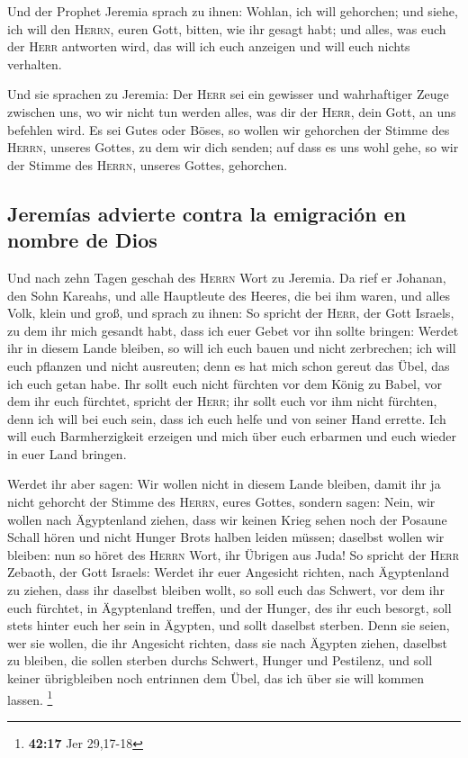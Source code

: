  Und der Prophet Jeremia sprach zu ihnen: Wohlan, ich will
gehorchen; und siehe, ich will den \textsc{Herrn}, euren Gott, bitten,
wie ihr gesagt habt; und alles, was euch der \textsc{Herr} antworten
wird, das will ich euch anzeigen und will euch nichts verhalten.

 Und sie sprachen zu Jeremia: Der \textsc{Herr} sei ein
gewisser und wahrhaftiger Zeuge zwischen uns, wo wir nicht tun werden
alles, was dir der \textsc{Herr}, dein Gott, an uns befehlen wird.
 Es sei Gutes oder Böses, so wollen wir gehorchen der
Stimme des \textsc{Herrn}, unseres Gottes, zu dem wir dich senden; auf
dass es uns wohl gehe, so wir der Stimme des \textsc{Herrn}, unseres
Gottes, gehorchen.

\hypertarget{jeremuxedas-advierte-contra-la-emigraciuxf3n-en-nombre-de-dios}{%
\subsection{Jeremías advierte contra la emigración en nombre de
Dios}\label{jeremuxedas-advierte-contra-la-emigraciuxf3n-en-nombre-de-dios}}

 Und nach zehn Tagen geschah des \textsc{Herrn} Wort zu
Jeremia.  Da rief er Johanan, den Sohn Kareahs, und alle
Hauptleute des Heeres, die bei ihm waren, und alles Volk, klein und
groß,  und sprach zu ihnen: So spricht der \textsc{Herr},
der Gott Israels, zu dem ihr mich gesandt habt, dass ich euer Gebet vor
ihn sollte bringen:  Werdet ihr in diesem Lande bleiben,
so will ich euch bauen und nicht zerbrechen; ich will euch pflanzen und
nicht ausreuten; denn es hat mich schon gereut das Übel, das ich euch
getan habe.  Ihr sollt euch nicht fürchten vor dem König
zu Babel, vor dem ihr euch fürchtet, spricht der \textsc{Herr}; ihr
sollt euch vor ihm nicht fürchten, denn ich will bei euch sein, dass ich
euch helfe und von seiner Hand errette.  Ich will euch
Barmherzigkeit erzeigen und mich über euch erbarmen und euch wieder in
euer Land bringen.

 Werdet ihr aber sagen: Wir wollen nicht in diesem Lande
bleiben, damit ihr ja nicht gehorcht der Stimme des \textsc{Herrn},
eures Gottes,  sondern sagen: Nein, wir wollen nach
Ägyptenland ziehen, dass wir keinen Krieg sehen noch der Posaune Schall
hören und nicht Hunger Brots halben leiden müssen; daselbst wollen wir
bleiben:  nun so höret des \textsc{Herrn} Wort, ihr
Übrigen aus Juda! So spricht der \textsc{Herr} Zebaoth, der Gott
Israels: Werdet ihr euer Angesicht richten, nach Ägyptenland zu ziehen,
dass ihr daselbst bleiben wollt,  so soll euch das
Schwert, vor dem ihr euch fürchtet, in Ägyptenland treffen, und der
Hunger, des ihr euch besorgt, soll stets hinter euch her sein in
Ägypten, und sollt daselbst sterben.  Denn sie seien, wer
sie wollen, die ihr Angesicht richten, dass sie nach Ägypten ziehen,
daselbst zu bleiben, die sollen sterben durchs Schwert, Hunger und
Pestilenz, und soll keiner übrigbleiben noch entrinnen dem Übel, das ich
über sie will kommen lassen. \footnote{\textbf{42:17} Jer 29,17-18}

